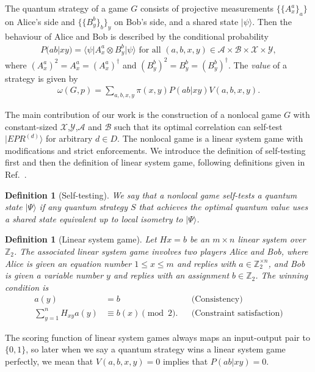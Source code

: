 \documentclass[11pt,letterpaper]{article}
\newcommand{\ket}[1]{|#1\rangle}
\newcommand{\bra}[1]{\langle#1|}
\newcommand{\x}{\otimes}
\newcommand{\Z}{\mathbb{Z}}
\newcommand{\calX}{\mathcal{X}}
\newcommand{\calY}{\mathcal{Y}}
\newcommand{\calA}{\mathcal{A}}
\newcommand{\calB}{\mathcal{B}}
\newcommand{\1}{\mathbb{1}}
\newcommand{\EPR}[1]{EPR^{(#1)}}
\newcommand{\G}{G}
\newcommand{\pr}[2]{P(#1|#2)}
\newtheorem{definition}[theorem]{Definition}
\theoremstyle{definition}
\begin{document}
The quantum strategy of a game $G$ consists of projective measurements $\{\{A_x^a\}_a\}$ on Alice's side and 
$\{\{B_y^b\}_b\}_y$ on Bob's side, and a shared state $\ket{\psi}$. Then the behaviour of Alice and Bob is described 
by the conditional probability
\begin{align}
	\pr{ab}{xy} = \bra{\psi} A_x^a \x B_y^b \ket{\psi} \text{ for all } (a,b,x,y) \in \calA \times \calB \times \calX \times \calY,
\end{align}
where $(A_x^a)^2 = A_x^a = (A_x^a)^\dagger$ and $(B_y^b)^2 = B_y^b = (B_y^b)^\dagger$.
The \emph{value} of a strategy is given by
\begin{align}
	\omega(G,p)  = \sum_{a,b,x,y} \pi(x,y) \pr{ab}{xy} V(a,b,x,y).
\end{align} 

The main contribution of our work is the construction of a nonlocal game $\G$ with constant-sized $\calX$,$\calY$,$\calA$ and $\calB$
such that its optimal correlation can self-test $\ket{\EPR{d}}$ for arbitrary $d \in D$. 
The nonlocal game is a linear system game with modifications and strict enforcements. 
We introduce the definition of self-testing first and then the definition of linear system game, 
following definitions given in Ref.~\cite{coladan2017, slofstra2017}.
\begin{definition}[Self-testing]
	We say that a nonlocal game self-tests a quantum state $\ket{\Psi}$ if 
	any quantum strategy $S$ that achieves the optimal quantum value uses a shared state equivalent up to local isometry to $\ket{\Psi}$.
\end{definition}
\begin{definition}[Linear system game]
 Let $Hx = b$ be an $m \times n$ linear system over $\Z_2$. The associated linear system game involves two
 players Alice and Bob, where Alice is given an equation number $1 \leq x \leq m$ and replies with $a \in \Z_2^{\times n}$,
 and Bob is given a variable number $y$ and replies with an assignment $b \in \Z_2$. The winning condition is 
 \begin{align*}
 	a(y) &= b && \text{(Consistency)} \\
	\sum_{y = 1}^n H_{xy} a(y) &\equiv b(x) \pmod 2. &&\text{(Constraint satisfaction)}
 \end{align*}
\end{definition}
The scoring function of linear system games always maps an input-output pair to $\{0,1\}$, 
so later when we say a quantum strategy wins a linear system game perfectly, we mean that 
$V(a,b,x,y) =0$ implies that $\pr{ab}{xy} = 0$.
\end{document}
